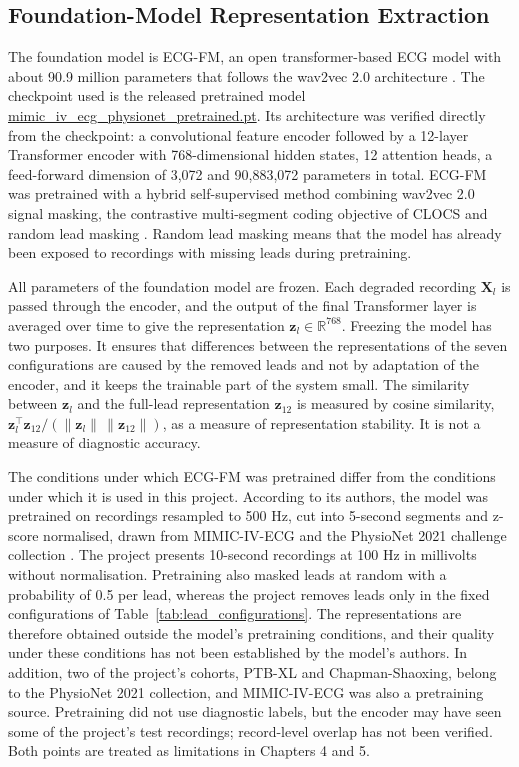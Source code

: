 \subsection{Foundation-Model Representation Extraction}
The foundation model is ECG-FM, an open transformer-based ECG model with about 90.9 million parameters that follows the wav2vec 2.0 architecture \cite{MCKEEN2025ECGFM}. The checkpoint used is the released pretrained model \url{mimic_iv_ecg_physionet_pretrained.pt}. Its architecture was verified directly from the checkpoint: a convolutional feature encoder followed by a 12-layer Transformer encoder with 768-dimensional hidden states, 12 attention heads, a feed-forward dimension of 3,072 and 90,883,072 parameters in total. ECG-FM was pretrained with a hybrid self-supervised method combining wav2vec 2.0 signal masking, the contrastive multi-segment coding objective of CLOCS and random lead masking \cite{MCKEEN2025ECGFM,OH2022LEADAGNOSTIC}. Random lead masking means that the model has already been exposed to recordings with missing leads during pretraining.

All parameters of the foundation model are frozen. Each degraded recording $\mathbf{X}_l$ is passed through the encoder, and the output of the final Transformer layer is averaged over time to give the representation $\mathbf{z}_l \in \mathbb{R}^{768}$. Freezing the model has two purposes. It ensures that differences between the representations of the seven configurations are caused by the removed leads and not by adaptation of the encoder, and it keeps the trainable part of the system small. The similarity between $\mathbf{z}_l$ and the full-lead representation $\mathbf{z}_{12}$ is measured by cosine similarity, $\mathbf{z}_l^{\top}\mathbf{z}_{12} / (\lVert\mathbf{z}_l\rVert\,\lVert\mathbf{z}_{12}\rVert)$, as a measure of representation stability. It is not a measure of diagnostic accuracy.

The conditions under which ECG-FM was pretrained differ from the conditions under which it is used in this project. According to its authors, the model was pretrained on recordings resampled to 500 Hz, cut into 5-second segments and z-score normalised, drawn from MIMIC-IV-ECG and the PhysioNet 2021 challenge collection \cite{MCKEEN2025ECGFM}. The project presents 10-second recordings at 100 Hz in millivolts without normalisation. Pretraining also masked leads at random with a probability of 0.5 per lead, whereas the project removes leads only in the fixed configurations of Table~\ref{tab:lead_configurations}. The representations are therefore obtained outside the model's pretraining conditions, and their quality under these conditions has not been established by the model's authors. In addition, two of the project's cohorts, PTB-XL and Chapman-Shaoxing, belong to the PhysioNet 2021 collection, and MIMIC-IV-ECG was also a pretraining source. Pretraining did not use diagnostic labels, but the encoder may have seen some of the project's test recordings; record-level overlap has not been verified. Both points are treated as limitations in Chapters 4 and 5.


